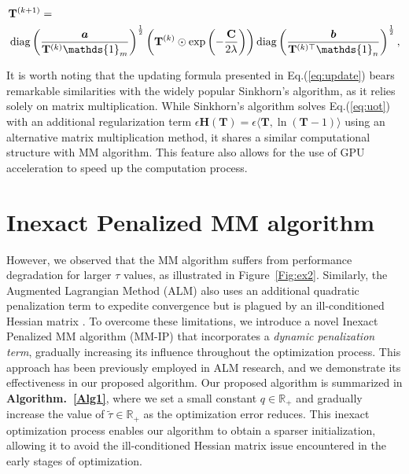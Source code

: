 \documentclass[a4paper,twocolumn]{article}
\newcommand{\R}{\mathbb{R}}
\newcommand{\one}{\mathds{1}}
\newcommand{\mat}[1]{\mathbf{#1}}
\renewcommand{\vec}[1]{\bm{#1}}
\begin{document}
\begin{align}
\label{eq:update}
&\mat{T}^{(k+1)}=\notag\\
&\operatorname{diag}\left(\frac{\vec a}{\mat{T}^{(k)} \one_m}\right)^{\frac{1}{2}}\left(\mat{T}^{(k)} \odot \exp \left(-\frac{\mat C}{2 \lambda}\right)\right)
\operatorname{diag}\left(\frac{\vec{b}}{\mat{T}^{(k) \top} \one_n}\right)^{\frac{1}{2}},\notag\\
\end{align}

It is worth noting that the updating formula presented in Eq.(\ref{eq:update}) bears remarkable similarities with the widely popular Sinkhorn's algorithm, as it relies solely on matrix multiplication. While Sinkhorn's algorithm solves Eq.(\ref{eq:uot}) with an additional regularization term $\epsilon \mat H(\mat T) = \epsilon \langle \mat T,\ln(\mat T - 1)\rangle$ using an alternative matrix multiplication method, it shares a similar computational structure with MM algorithm. This feature also allows for the use of GPU acceleration to speed up the computation process.


\section{Inexact Penalized MM algorithm}
However, we observed that the MM algorithm suffers from performance degradation for larger $\tau$ values, as illustrated in Figure~\ref{Fig:ex2}. Similarly, the Augmented Lagrangian Method (ALM) also uses an additional quadratic penalization term to expedite convergence but is plagued by an ill-conditioned Hessian matrix \cite{doi:10.1137/1.9781611973365}.
To overcome these limitations, we introduce a novel Inexact Penalized MM algorithm (MM-IP) that incorporates a {\it dynamic penalization term}, gradually increasing its influence throughout the optimization process. This approach has been previously employed in ALM research, and we demonstrate its effectiveness in our proposed algorithm. Our proposed algorithm is summarized in {\bf Algorithm.~\ref{Alg1}}, where we set a small constant $q \in \R_+ $ and gradually increase the value of $\tilde{\tau}\in \R_+$ as the optimization error reduces. This inexact optimization process enables our algorithm to obtain a sparser initialization, allowing it to avoid the ill-conditioned Hessian matrix issue encountered in the early stages of optimization.
\end{document}
